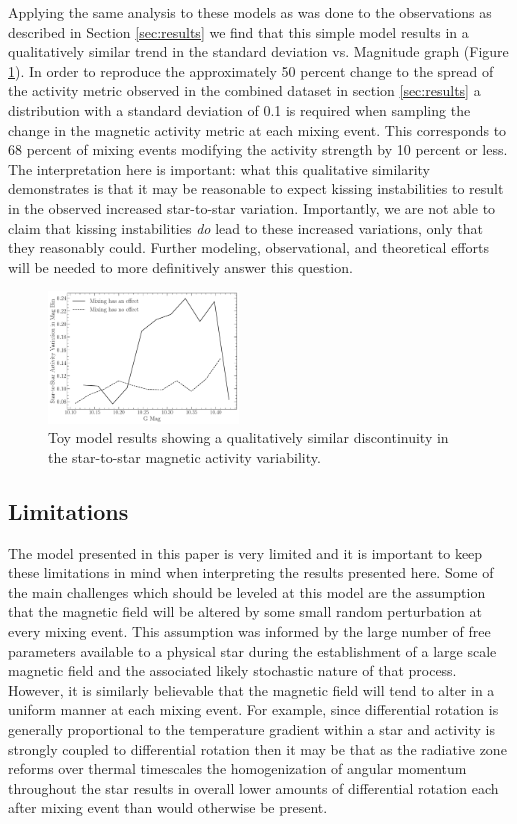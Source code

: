 Applying the same analysis to these models as was done to the observations as
described in Section \ref{sec:results} we find that this simple model results
in a qualitatively similar trend in the standard deviation vs. Magnitude graph
(Figure \ref{fig:model}). In order to reproduce the approximately 50 percent
change to the spread of the activity metric observed in the combined dataset in
section \ref{sec:results} a distribution with a standard deviation of 0.1 is
required when sampling the change in the magnetic activity metric at each
mixing event. This corresponds to 68 percent of mixing events modifying the
activity strength by 10 percent or less. The interpretation here is important:
what this qualitative similarity demonstrates is that it may be reasonable to
expect kissing instabilities to result in the observed increased star-to-star
variation. Importantly, we are not able to claim that kissing instabilities
\textit{do} lead to these increased variations, only that they reasonably
could. Further modeling, observational, and theoretical efforts will be needed
to more definitively answer this question.

\begin{figure}
  \centering
  \includegraphics[width=0.45\textwidth]{SpreadModel.pdf}
  \caption{Toy model results showing a qualitatively similar discontinuity in the star-to-star magnetic activity variability.}
  \label{fig:model}
\end{figure}

\subsection{Limitations}
The model presented in this paper is very limited and it is important to keep
these limitations in mind when interpreting the results presented here. Some of
the main challenges which should be leveled at this model are the assumption
that the magnetic field will be altered by some small random perturbation at
every mixing event. This assumption was informed by the large number of free
parameters available to a physical star during the establishment of a large
scale magnetic field and the associated likely stochastic nature of that
process. However, it is similarly believable that the magnetic field will tend
to alter in a uniform manner at each mixing event. For example, since
differential rotation is generally proportional to the temperature gradient
within a star and activity is strongly coupled to differential rotation then it
may be that as the radiative zone reforms over thermal timescales the
homogenization of angular momentum throughout the star results in overall lower
amounts of differential rotation each after mixing event than would otherwise
be present.

